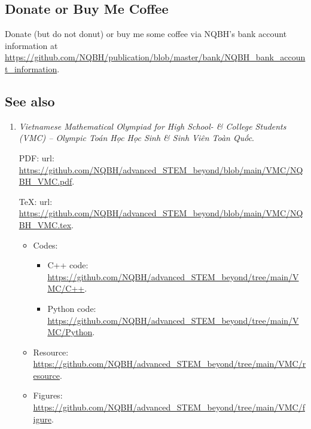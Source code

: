 \documentclass{article}
\begin{document}
\subsection{Donate or Buy Me Coffee}
Donate (but do not donut) or buy me some coffee via NQBH's bank account information at \url{https://github.com/NQBH/publication/blob/master/bank/NQBH_bank_account_information}.

\subsection{See also}

\begin{enumerate}
	\item {\it Vietnamese Mathematical Olympiad for High School- \& College Students (VMC) -- Olympic Toán Học Học Sinh \& Sinh Viên Toàn Quốc}.
	
	PDF: {\sc url}: \url{https://github.com/NQBH/advanced_STEM_beyond/blob/main/VMC/NQBH_VMC.pdf}.
	
	\TeX: {\sc url}: \url{https://github.com/NQBH/advanced_STEM_beyond/blob/main/VMC/NQBH_VMC.tex}.
	\begin{itemize}
		\item Codes:
		\begin{itemize}
			\item C++ code: \url{https://github.com/NQBH/advanced_STEM_beyond/tree/main/VMC/C++}.
			\item Python code: \url{https://github.com/NQBH/advanced_STEM_beyond/tree/main/VMC/Python}.
		\end{itemize}
		\item Resource: \url{https://github.com/NQBH/advanced_STEM_beyond/tree/main/VMC/resource}.
		\item Figures: \url{https://github.com/NQBH/advanced_STEM_beyond/tree/main/VMC/figure}.
	\end{itemize}
\end{enumerate}


\printbibliography[heading=bibintoc]
	
\end{document}
